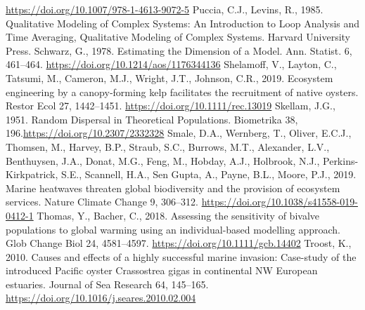 \documentclass[12pt]{report}
\begin{document}
\begin{singlespacing}
\href{https://doi.org/10.1007/978-1-4613-9072-5}{https://doi.org/10.1007/978-1-4613-9072-5}
\newline\newline
Puccia, C.J., Levins, R., 1985. Qualitative Modeling of Complex Systems: An Introduction to Loop Analysis and Time Averaging, Qualitative Modeling of Complex Systems. Harvard University Press.
Schwarz, G., 1978. Estimating the Dimension of a Model. Ann. Statist. 6, 461–464. \href{https://doi.org/10.1214/aos/1176344136}{https://doi.org/10.1214/aos/1176344136}
\newline\newline
Shelamoff, V., Layton, C., Tatsumi, M., Cameron, M.J., Wright, J.T., Johnson, C.R., 2019. Ecosystem engineering by a canopy‐forming kelp facilitates the recruitment of native oysters. Restor Ecol 27, 1442–1451. \href{https://doi.org/10.1111/rec.13019}{https://doi.org/10.1111/rec.13019}
\newline\newline
Skellam, J.G., 1951. Random Dispersal in Theoretical Populations. Biometrika 38, 196.\newline \href{https://doi.org/10.2307/2332328}{https://doi.org/10.2307/2332328}
\newline\newline
Smale, D.A., Wernberg, T., Oliver, E.C.J., Thomsen, M., Harvey, B.P., Straub, S.C., Burrows, M.T., Alexander, L.V., Benthuysen, J.A., Donat, M.G., Feng, M., Hobday, A.J., Holbrook, N.J., Perkins-Kirkpatrick, S.E., Scannell, H.A., Sen Gupta, A., Payne, B.L., Moore, P.J., 2019. Marine heatwaves threaten global biodiversity and the provision of ecosystem services. Nature Climate Change 9, 306–312. \href{https://doi.org/10.1038/s41558-019-0412-1}{https://doi.org/10.1038/s41558-019-0412-1}
\newline\newline
Thomas, Y., Bacher, C., 2018. Assessing the sensitivity of bivalve populations to global warming using an individual-based modelling approach. Glob Change Biol 24, 4581–4597. \newline
\href{https://doi.org/10.1111/gcb.14402}{https://doi.org/10.1111/gcb.14402}
\newline\newline
Troost, K., 2010. Causes and effects of a highly successful marine invasion: Case-study of the introduced Pacific oyster Crassostrea gigas in continental NW European estuaries. Journal of Sea Research 64, 145–165. \href{https://doi.org/10.1016/j.seares.2010.02.004}{https://doi.org/10.1016/j.seares.2010.02.004}

\end{singlespacing}
\end{document}
